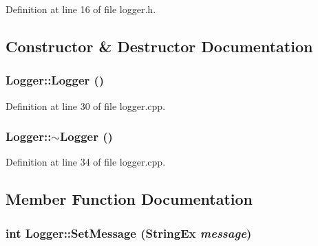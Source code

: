 Definition at line 16 of file logger.h.

\subsection{Constructor \& Destructor Documentation}
\hypertarget{classkmaOrange_1_1Logger_bc41bfb031d896170c7675fa96a6b30c}{
\subsubsection[{Logger}]{\setlength{\rightskip}{0pt plus 5cm}Logger::Logger ()}}
\label{classkmaOrange_1_1Logger_bc41bfb031d896170c7675fa96a6b30c}




Definition at line 30 of file logger.cpp.\hypertarget{classkmaOrange_1_1Logger_cb668a9e186a25fbaad2e4af6d1ed00a}{
\subsubsection[{$\sim$Logger}]{\setlength{\rightskip}{0pt plus 5cm}Logger::$\sim$Logger ()}}
\label{classkmaOrange_1_1Logger_cb668a9e186a25fbaad2e4af6d1ed00a}




Definition at line 34 of file logger.cpp.

\subsection{Member Function Documentation}
\hypertarget{classkmaOrange_1_1Logger_0d95f7da1542407908257b94c5f37475}{
\subsubsection[{SetMessage}]{\setlength{\rightskip}{0pt plus 5cm}int Logger::SetMessage ({\bf StringEx} {\em message})}}
\label{classkmaOrange_1_1Logger_0d95f7da1542407908257b94c5f37475}




